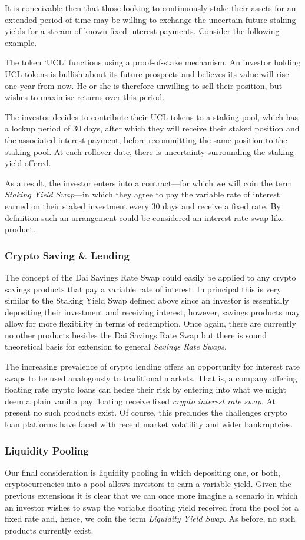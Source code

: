 It is conceivable then that those looking to continuously stake their assets for an extended period of time may be willing to exchange the uncertain future staking yields for a stream of known fixed interest payments. Consider the following example.

The token `UCL' functions using a proof-of-stake mechanism. An investor holding UCL tokens is bullish about its future prospects and believes its value will rise one year from now. He or she is therefore unwilling to sell their position, but wishes to maximise returns over this period.

The investor decides to contribute their UCL tokens to a staking pool, which has a lockup period of 30 days, after which they will receive their staked position and the associated interest payment, before recommitting the same position to the staking pool. At each rollover date, there is uncertainty surrounding the staking yield offered.

As a result, the investor enters into a contract––for which we will coin the term \textit{Staking Yield Swap}––in which they agree to pay the variable rate of interest earned on their staked investment every 30 days and receive a fixed rate. By definition such an arrangement could be considered an interest rate swap-like product. 

\subsubsection{Crypto Saving \& Lending}
The concept of the Dai Savings Rate Swap could easily be applied to any crypto savings products that pay a variable rate of interest. In principal this is very similar to the Staking Yield Swap defined above since an investor is essentially depositing their investment and receiving interest, however, savings products may allow for more flexibility in terms of redemption. Once again, there are currently no other products besides the Dai Savings Rate Swap but there is sound theoretical basis for extension to general \textit{Savings Rate Swaps}.

The increasing prevalence of crypto lending offers an opportunity for interest rate swaps to be used analogously to traditional markets. That is, a company offering floating rate crypto loans can hedge their risk by entering into what we might deem a plain vanilla pay floating receive fixed \textit{crypto interest rate swap}. At present no such products exist. Of course, this precludes the challenges crypto loan platforms have faced with recent market volatility and wider bankruptcies.

\subsubsection{Liquidity Pooling}
Our final consideration is liquidity pooling in which depositing one, or both, cryptocurrencies into a pool allows investors to earn a variable yield. Given the previous extensions it is clear that we can once more imagine a scenario in which an investor wishes to swap the variable floating yield received from the pool for a fixed rate and, hence, we coin the term \textit{Liquidity Yield Swap}. As before, no such products currently exist.
